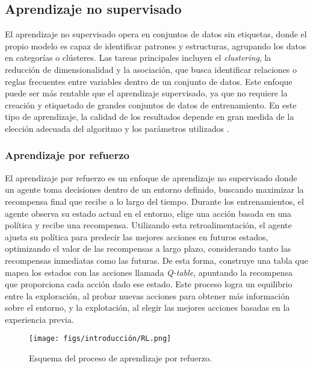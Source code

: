 \subsection{Aprendizaje no supervisado}

El aprendizaje no supervisado opera en conjuntos de datos sin etiquetas, donde el propio modelo es capaz de identificar patrones y estructuras, agrupando los datos en categorías o clústeres. Las tareas principales incluyen el \textit{clustering}, la reducción de dimensionalidad y la asociación, que busca identificar relaciones o reglas frecuentes entre variables dentro de un conjunto de datos. Este enfoque puede ser más rentable que el aprendizaje supervisado, ya que no requiere la creación y etiquetado de grandes conjuntos de datos de entrenamiento. En este tipo de aprendizaje, la calidad de los resultados depende en gran medida de la elección adecuada del algoritmo y los parámetros utilizados \cite{no-supervised-learning}.

\subsubsection{Aprendizaje por refuerzo}

El aprendizaje por refuerzo es un enfoque de aprendizaje no supervisado donde un agente toma decisiones dentro de un entorno definido, buscando maximizar la recompensa final que recibe a lo largo del tiempo. Durante los entrenamientos, el agente observa su estado actual en el entorno, elige una acción basada en una política y recibe una recompensa. Utilizando esta retroalimentación, el agente ajusta su política para predecir las mejores acciones en futuros estados, optimizando el valor de las recompensas a largo plazo, considerando tanto las recompensas inmediatas como las futuras. De esta forma, construye una tabla que mapea los estados con las acciones llamada \textit{Q-table}, apuntando la recompensa que proporciona cada acción dado ese estado. Este proceso logra un equilibrio entre la exploración, al probar nuevas acciones para obtener más información sobre el entorno, y la explotación, al elegir las mejores acciones basadas en la experiencia previa.

\begin{figure}[ht]
  \begin{center}
    \texttt{[image: figs/introducción/RL.png]}
  \end{center}
  \caption{Esquema del proceso de aprendizaje por refuerzo.}
  \label{rl}
\end{figure}


